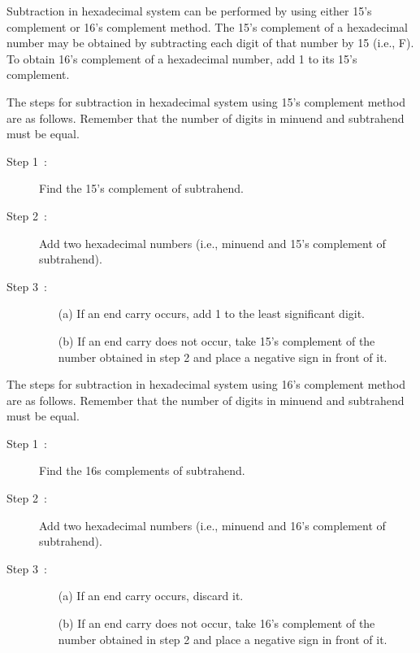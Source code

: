 Subtraction in hexadecimal system can be performed by using either 15's complement or 16's complement method. The 15's complement of a hexadecimal number may be obtained by subtracting each digit of that number by 15 (i.e., F). To obtain 16's complement of a hexadecimal number, add 1 to its 15's complement.

\smallskip
{} The steps for subtraction in hexadecimal system using 15's complement method are as follows. Remember that the number of digits in minuend and subtrahend must be equal.
\begin{description}
\item[Step 1~:] Find the 15's complement of subtrahend.

\item[Step 2~:] Add two hexadecimal numbers (i.e., minuend and 15's complement of subtrahend).

\item[Step 3~:] 
\begin{itemize}
\item[(a)] If an end carry occurs, add 1 to the least significant digit.

\item[(b)] If an end carry does not occur, take 15's complement of the number obtained in step 2 and place a negative sign in front of it.
\end{itemize}
\end{description}

 The steps for subtraction in hexadecimal system using 16's complement method are as follows. Remember that the number of digits in minuend and subtrahend must be equal.
\begin{description}
\item[Step 1~:] Find the 16s complements of subtrahend.

\item[Step 2~:] Add two hexadecimal numbers (i.e., minuend and 16's complement of subtrahend).

\item[Step 3~:] 
\begin{itemize}
\item[(a)] If an end carry occurs, discard it.

\item[(b)] If an end carry does not occur, take 16's complement of the number obtained in step 2 and place a negative sign in front of it.
\end{itemize}
\end{description}

